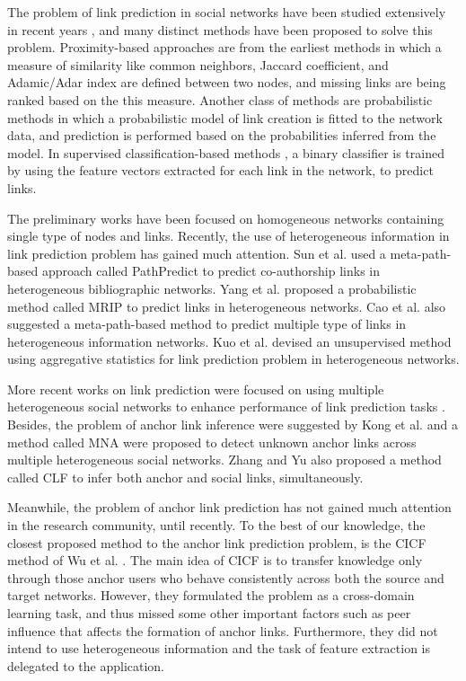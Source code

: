 \documentclass[conference]{IEEEtran}
\begin{document}
The problem of link prediction in social networks have been studied extensively in recent years \cite{liben2007link, lu2011link, al2011survey, wang2014review}, and many distinct methods have been proposed to solve this problem. Proximity-based approaches are from the earliest methods in which a measure of similarity like common neighbors, Jaccard coefficient, and Adamic/Adar index \cite{adamic2003friends} are defined between two nodes, and missing links are being ranked based on the this measure. Another class of methods are probabilistic methods \cite{clauset2008hierarchical, airoldi2009mixed, taskar2003link} in which a probabilistic model of link creation is fitted to the network data, and prediction is performed based on the probabilities inferred from the model.
In supervised classification-based methods \cite{al2006link}, a binary classifier is trained by using the feature vectors extracted for each link in the network, to predict links.

The preliminary works have been focused on homogeneous networks containing single type of nodes and links. Recently, the use of heterogeneous information in link prediction problem has gained much attention. Sun et al. \cite{sun2011co} used a meta-path-based approach called PathPredict to predict co-authorship links in heterogeneous bibliographic networks. Yang et al. \cite{yang2012link} proposed a probabilistic method called MRIP to predict links in heterogeneous networks. Cao et al. \cite{cao2014collective} also suggested a meta-path-based method to predict multiple type of links in heterogeneous information networks. Kuo et al. \cite{kuo2013unsupervised} devised an unsupervised method using aggregative statistics for link prediction problem in heterogeneous networks.

More recent works on link prediction were focused on using multiple heterogeneous social networks to enhance performance of link prediction tasks \cite{zhang2013predicting, zhang2014transferring, zhang2014meta}. Besides, the problem of anchor link inference were suggested by Kong et al. \cite{kong2013} and a method called MNA were proposed to detect unknown anchor links across multiple heterogeneous social networks. Zhang and Yu \cite{zhang2015integrated} also proposed a method called CLF to infer both anchor and social links, simultaneously.

Meanwhile, the problem of anchor link prediction has not gained much attention in the research community, until recently. To the best of our knowledge, the closest proposed method to the anchor link prediction problem, is the CICF method of Wu et al. \cite{wu2014learning}. The main idea of CICF is to transfer knowledge only through those anchor users who behave consistently across both the source and target networks. However, they formulated the problem as a cross-domain learning task, and thus missed some other important factors such as peer influence that affects the formation of anchor links. Furthermore, they did not intend to use heterogeneous information and the task of feature extraction is delegated to the application. 
\end{document}
